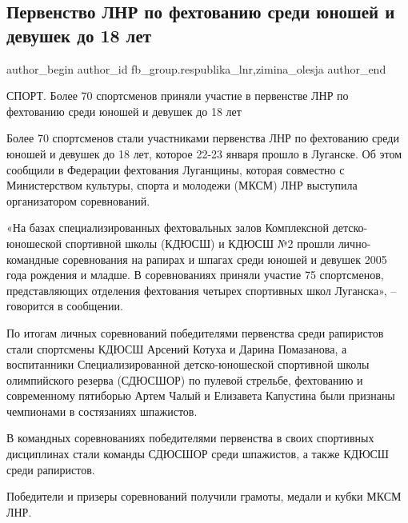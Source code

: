  
 
 
 
 
 
\subsection{Первенство ЛНР по фехтованию среди юношей и девушек до 18 лет}
\label{sec:24_01_2022.fb.fb_group.respublika_lnr.1.pervenstvo_lnr_fehtovanie}
 
\ifcmt
 author_begin
   author_id fb_group.respublika_lnr,zimina_olesja
 author_end
\fi

СПОРТ. Более 70 спортсменов приняли участие в первенстве ЛНР по фехтованию
среди юношей и девушек до 18 лет 

Более 70 спортсменов стали участниками первенства ЛНР по фехтованию среди
юношей и девушек до 18 лет, которое 22-23 января прошло в Луганске. Об этом
сообщили в Федерации фехтования Луганщины, которая совместно с Министерством
культуры, спорта и молодежи (МКСМ) ЛНР выступила организатором соревнований.


«На базах специализированных фехтовальных залов Комплексной детско-юношеской
спортивной школы (КДЮСШ) и КДЮСШ №2 прошли лично-командные соревнования на
рапирах и шпагах среди юношей и девушек 2005 года рождения и младше. В
соревнованиях приняли участие 75 спортсменов, представляющих отделения
фехтования четырех спортивных школ Луганска», – говорится в сообщении.


По итогам личных соревнований победителями первенства среди рапиристов стали
спортсмены КДЮСШ Арсений Котуха и Дарина Помазанова, а воспитанники
Специализированной детско-юношеской спортивной школы олимпийского резерва
(СДЮСШОР) по пулевой стрельбе, фехтованию и современному пятиборью Артем Чалый
и Елизавета Капустина были признаны чемпионами в состязаниях шпажистов.


В командных соревнованиях победителями первенства в своих спортивных
дисциплинах стали команды СДЮСШОР среди шпажистов, а также КДЮСШ среди
рапиристов.

Победители и призеры соревнований получили грамоты, медали и кубки МКСМ ЛНР.
